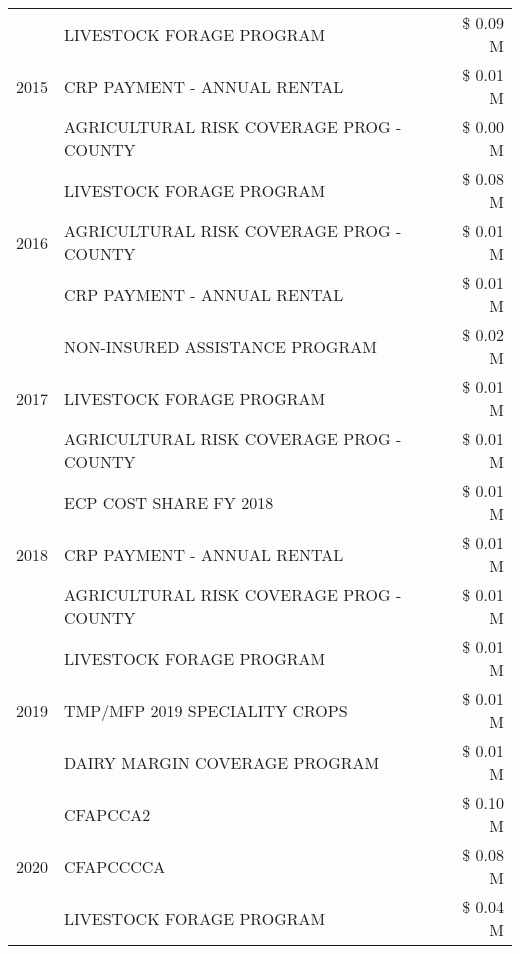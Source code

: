 \begin{tabular}{llr}
\cline{1-3}
\multirow[t]{3}{*}{2015} & LIVESTOCK FORAGE PROGRAM & \$ 0.09 M \\
 & CRP PAYMENT - ANNUAL RENTAL & \$ 0.01 M \\
 & AGRICULTURAL RISK COVERAGE PROG - COUNTY & \$ 0.00 M \\
\cline{1-3}
\multirow[t]{3}{*}{2016} & LIVESTOCK FORAGE PROGRAM                      & \$ 0.08 M \\
 & AGRICULTURAL RISK COVERAGE PROG - COUNTY      & \$ 0.01 M \\
 & CRP PAYMENT - ANNUAL RENTAL                   & \$ 0.01 M \\
\cline{1-3}
\multirow[t]{3}{*}{2017} & NON-INSURED ASSISTANCE PROGRAM & \$ 0.02 M \\
 & LIVESTOCK FORAGE PROGRAM & \$ 0.01 M \\
 & AGRICULTURAL RISK COVERAGE PROG - COUNTY & \$ 0.01 M \\
\cline{1-3}
\multirow[t]{3}{*}{2018} & ECP COST SHARE FY 2018 & \$ 0.01 M \\
 & CRP PAYMENT - ANNUAL RENTAL & \$ 0.01 M \\
 & AGRICULTURAL RISK COVERAGE PROG - COUNTY & \$ 0.01 M \\
\cline{1-3}
\multirow[t]{3}{*}{2019} & LIVESTOCK FORAGE PROGRAM & \$ 0.01 M \\
 & TMP/MFP 2019 SPECIALITY CROPS & \$ 0.01 M \\
 & DAIRY MARGIN COVERAGE PROGRAM & \$ 0.01 M \\
\cline{1-3}
\multirow[t]{3}{*}{2020} & CFAPCCA2 & \$ 0.10 M \\
 & CFAPCCCCA & \$ 0.08 M \\
 & LIVESTOCK FORAGE PROGRAM & \$ 0.04 M \\
\cline{1-3}
\bottomrule
\end{tabular}
